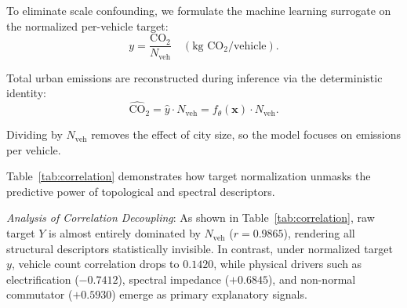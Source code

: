 \documentclass[journal]{IEEEtran}
\begin{document}
To eliminate scale confounding, we formulate the machine learning surrogate on the normalized per-vehicle target:
\begin{equation}
y = \frac{\text{CO}_2}{N_{\text{veh}}} \quad (\text{kg } \text{CO}_2 / \text{vehicle}).
\label{eq:normalized_target}
\end{equation}

Total urban emissions are reconstructed during inference via the deterministic identity:
\begin{equation}
\widehat{\text{CO}}_2 = \hat{y} \cdot N_{\text{veh}} = f_\theta(\mathbf{x}) \cdot N_{\text{veh}}.
\label{eq:reconstructed_target}
\end{equation}

Dividing by $N_{\text{veh}}$ removes the effect of city size, so the model focuses on emissions per vehicle.

Table~\ref{tab:correlation} demonstrates how target normalization unmasks the predictive power of topological and spectral descriptors.

\begin{table}[htbp]
\caption{Statistical Correlation of Top Descriptors with Normalized ($y$) vs. Raw Total ($Y$) Emissions}
\label{tab:correlation}
\centering
{}
\end{table}

\textit{Analysis of Correlation Decoupling}:
As shown in Table~\ref{tab:correlation}, raw target $Y$ is almost entirely dominated by $N_{\text{veh}}$ ($r = 0.9865$), rendering all structural descriptors statistically invisible. In contrast, under normalized target $y$, vehicle count correlation drops to $0.1420$, while physical drivers such as electrification ($-0.7412$), spectral impedance ($+0.6845$), and non-normal commutator ($+0.5930$) emerge as primary explanatory signals.
\end{document}
